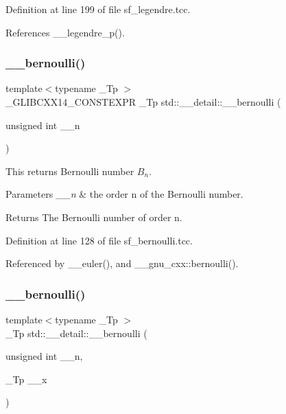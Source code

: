 Definition at line 199 of file sf\+\_\+legendre.\+tcc.



References \+\_\+\+\_\+legendre\+\_\+p().

\mbox{\label{namespacestd_1_1____detail_a68ae2aecb4cdf37b72cd60409cdc500c}} 
\subsubsection{\texorpdfstring{\+\_\+\+\_\+bernoulli()}{\_\_bernoulli()}\hspace{0.1cm}{\footnotesize\ttfamily [1/2]}}
{\footnotesize\ttfamily template$<$typename \+\_\+\+Tp $>$ \\
\+\_\+\+G\+L\+I\+B\+C\+X\+X14\+\_\+\+C\+O\+N\+S\+T\+E\+X\+PR \+\_\+\+Tp std\+::\+\_\+\+\_\+detail\+::\+\_\+\+\_\+bernoulli (\begin{DoxyParamCaption}\item[{unsigned int}]{\+\_\+\+\_\+n }\end{DoxyParamCaption})}



This returns Bernoulli number $ B_n $. 


\begin{DoxyParams}{Parameters}
{\em \+\_\+\+\_\+n} & the order n of the Bernoulli number. \\
\hline
\end{DoxyParams}
\begin{DoxyReturn}{Returns}
The Bernoulli number of order n. 
\end{DoxyReturn}


Definition at line 128 of file sf\+\_\+bernoulli.\+tcc.



Referenced by \+\_\+\+\_\+euler(), and \+\_\+\+\_\+gnu\+\_\+cxx\+::bernoulli().

\mbox{\label{namespacestd_1_1____detail_a1171e65b7fb7712f0181fe7288acb343}} 
\subsubsection{\texorpdfstring{\+\_\+\+\_\+bernoulli()}{\_\_bernoulli()}\hspace{0.1cm}{\footnotesize\ttfamily [2/2]}}
{\footnotesize\ttfamily template$<$typename \+\_\+\+Tp $>$ \\
\+\_\+\+Tp std\+::\+\_\+\+\_\+detail\+::\+\_\+\+\_\+bernoulli (\begin{DoxyParamCaption}\item[{unsigned int}]{\+\_\+\+\_\+n,  }\item[{\+\_\+\+Tp}]{\+\_\+\+\_\+x }\end{DoxyParamCaption})}

